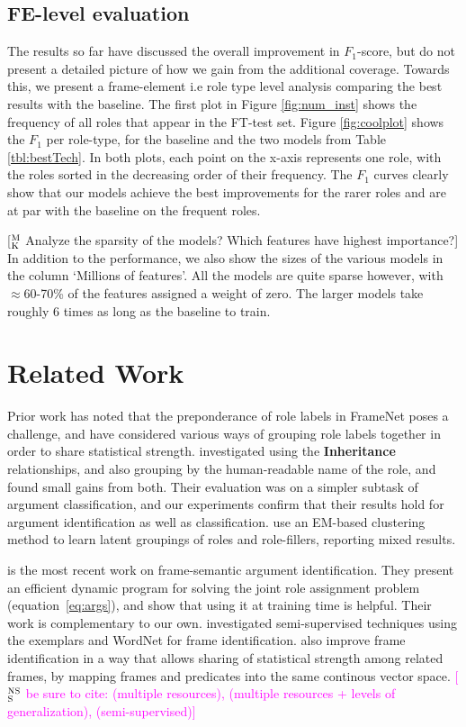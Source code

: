 \documentclass[11pt,a4paper]{article}
\newcommand{\ensuretext}[1]{#1}
\newcommand{\nssmarker}{\ensuretext{\textcolor{magenta}{\ensuremath{^{\textsc{NS}}_{\textsc{S}}}}}}
\newcommand{\mkmarker}{\ensuretext{\textcolor{mdgreen}{\ensuremath{^{\textsc{M}}_{\textsc{K}}}}}}
\newcommand{\arkcomment}[3]{\ensuretext{\textcolor{#3}{[#1 #2]}}}
\newcommand{\nss}[1]{\arkcomment{\nssmarker}{#1}{magenta}}
\newcommand{\mk}[1]{\arkcomment{\mkmarker}{#1}{mdgreen}}
\begin{document}
\subsection{FE-level evaluation}
The results so far have discussed the overall improvement in $F_1$-score, but do not present a detailed picture of how we gain from the additional
coverage. Towards this, we present a frame-element i.e role type level analysis comparing the best results with the baseline.
The first plot in Figure \ref{fig:num_inst} shows the frequency of all roles that appear in the FT-test set.
Figure \ref{fig:coolplot} shows the $F_1$ per role-type, for the baseline and the two models from Table \ref{tbl:bestTech}.
In both plots, each point on the x-axis represents one role, with the roles sorted in the decreasing order of their frequency.
The $F_1$ curves clearly show that our models achieve the best improvements for the rarer roles and are at par with the baseline on the frequent roles.

\mk{Analyze the sparsity of the models? Which features have highest importance?}
In addition to the performance, we also show the sizes of the various models in the column `Millions of features'.
All the models are quite sparse however,
with $\approx$60-70\% of the features assigned a weight of zero.
The larger models take roughly 6 times as long as the baseline to train. 


\section{Related Work}

Prior work has noted that the preponderance of role labels in FrameNet poses a challenge, and have considered various ways of grouping role labels together in order to share statistical strength. 
\citet{matsubayashi-09} investigated using the \textbf{Inheritance} relationships, and also grouping by the human-readable name of the role, and found small gains from both. Their evaluation was on a simpler subtask of argument classification, and our experiments confirm that their results hold for argument identification as well as classification.
\citet{baldewein-04} use an EM-based clustering method to learn latent groupings of roles and role-fillers, reporting mixed results.

\citet{tackstrom-15} is the most recent work on frame-semantic argument identification.
They present an efficient dynamic program for solving the joint role assignment problem (equation~\ref{eq:args}), and show that using it at training time is helpful.
Their work is complementary to our own.
\citet{das-11,das-12} investigated semi-supervised techniques using the exemplars and WordNet for frame identification.
\citet{hermann-14} also improve frame identification in a way that allows sharing of statistical strength among related frames, by mapping frames and predicates into the same continous vector space.
\nss{be sure to cite: \citep{shi-05} (multiple resources), \citep{merlo-09} (multiple resources + levels of generalization), \citep{furstenau-09} (semi-supervised)}
\end{document}
